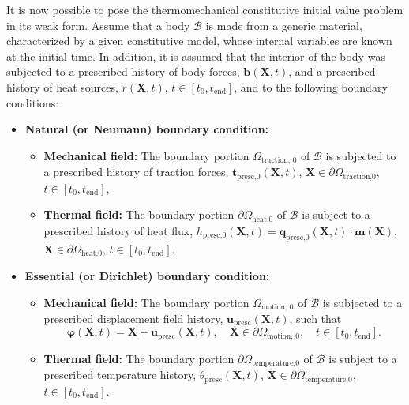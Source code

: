 It is now possible to pose the thermomechanical constitutive initial value problem in its weak form.
Assume that a body $\mathscr{B}$ is made from a generic material, characterized by a given constitutive model, whose internal variables are known at the initial time.
In addition, it is assumed that the interior of the body was subjected to a prescribed history of body forces, $\bm b(\bm X, t)$, and a prescribed history of heat sources, $r(\bm X,t)$, $t\in[t_0, t_\text{end}]$, and to the following boundary conditions:
\begin{itemize}
    \item \textbf{Natural (or Neumann) boundary condition:}
    \begin{itemize}
      \item \textbf{Mechanical field:} The boundary portion $\Omega_\text{traction, 0}$ of $\mathscr{B}$ is subjected to a prescribed history of traction forces, $\bm t_\text{presc,0}(\bm X, t)$, $\bm X\in \partial \Omega_\text{traction,0}$, $t\in[t_0, t_\text{end}]$,\\
      \item \textbf{Thermal field:} The boundary portion \(\partial \Omega_\text{heat,0}\) of \(\mathcal B\) is subject to a prescribed history of heat flux, \(h_\text{presc,0}(\bm X, t) = \bm q_\text{presc,0}(\bm X, t)\cdot \bm m(\bm X)\), \(\bm X \in \partial \Omega_\text{heat,0}\), \(t\in [t_0,t_\text{end}]\).
    \end{itemize}
    \item \textbf{Essential (or Dirichlet) boundary condition:}
    \begin{itemize}
      \item \textbf{Mechanical field:} The boundary portion $\Omega_\text{motion, 0}$ of $\mathscr{B}$ is subjected to a prescribed displacement field history, $\bm u_\text{presc}(\bm X, t)$, such that $$\bm \varphi(\bm X, t) = \bm X + \bm u_\text{presc}(\bm X, t),\quad \bm X\in \partial\Omega_\text{motion, 0},\quad t\in[t_0, t_\text{end}].$$
      \item \textbf{Thermal field:} The boundary portion \(\partial \Omega_\text{temperature,0}\) of \(\mathcal B\) is subject to a prescribed temperature history, \(\theta_\text{presc}(\bm X, t)\), \(\bm X \in \partial \Omega_\text{temperature,0}\), \(t\in [t_0,t_\text{end}]\).
    \end{itemize}
\end{itemize}

